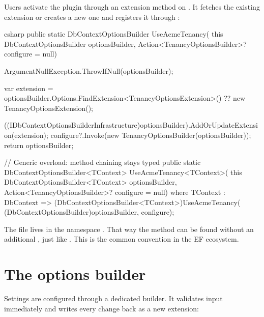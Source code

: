 Users activate the plugin through an extension method on
. It fetches the
existing extension or creates a new one and registers it through
:

\begin{sourcecode}{csharp}
public static DbContextOptionsBuilder UseAcmeTenancy(
    this DbContextOptionsBuilder optionsBuilder,
    Action<TenancyOptionsBuilder>? configure = null)
{
    ArgumentNullException.ThrowIfNull(optionsBuilder);

    var extension = optionsBuilder.Options.FindExtension<TenancyOptionsExtension>()
                    ?? new TenancyOptionsExtension();

    ((IDbContextOptionsBuilderInfrastructure)optionsBuilder).AddOrUpdateExtension(extension);
    configure?.Invoke(new TenancyOptionsBuilder(optionsBuilder));
    return optionsBuilder;
}

// Generic overload: method chaining stays typed
public static DbContextOptionsBuilder<TContext> UseAcmeTenancy<TContext>(
    this DbContextOptionsBuilder<TContext> optionsBuilder,
    Action<TenancyOptionsBuilder>? configure = null) where TContext : DbContext
    => (DbContextOptionsBuilder<TContext>)UseAcmeTenancy(
        (DbContextOptionsBuilder)optionsBuilder, configure);
\end{sourcecode}

The file lives in the namespace
. That way the
method can be found without an additional , just like
. This is the common convention in the EF ecosystem.

\section{The options builder}

Settings are configured through a dedicated builder. It validates input immediately and
writes every change back as a new extension:

